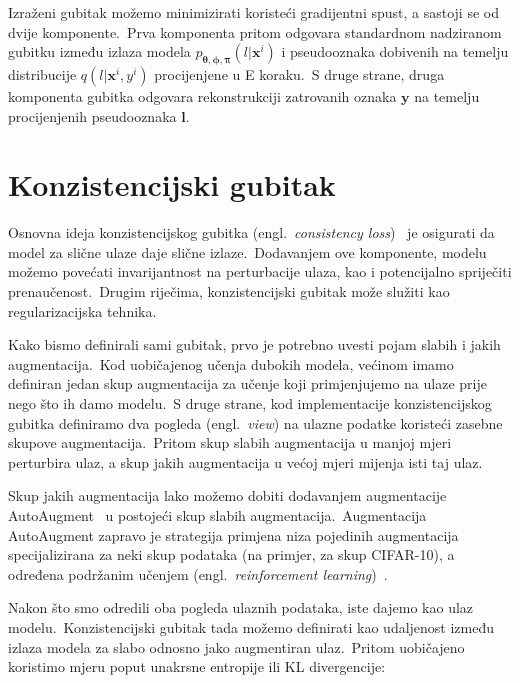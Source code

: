 \documentclass[diplomskirad]{fer}
\begin{document}
Izraženi gubitak možemo minimizirati koristeći gradijentni spust, a sastoji se od dvije komponente.\ 
Prva komponenta pritom odgovara standardnom nadziranom gubitku između izlaza modela $p_{\bm{\theta}, \bm{\phi}, \bm{\pi}}(l | \bm{x}^i)$ i pseudooznaka dobivenih na temelju distribucije $q(l | \bm{x}^i, y^i)$ procijenjene u E koraku.\ 
S druge strane, druga komponenta gubitka odgovara rekonstrukciji zatrovanih oznaka $\bm{y}$ na temelju procijenjenih pseudooznaka $\bm{l}$.\ 

\section{Konzistencijski gubitak}
\label{sek:con_loss}

Osnovna ideja konzistencijskog gubitka (engl.\ \textit{consistency loss})~\cite{berthelot2019mixmatch} je osigurati da model za slične ulaze daje slične izlaze.\ 
Dodavanjem ove komponente, modelu možemo povećati invarijantnost na perturbacije ulaza, kao i potencijalno spriječiti prenaučenost.\ 
Drugim riječima, konzistencijski gubitak može služiti kao regularizacijska tehnika.\ 

Kako bismo definirali sami gubitak, prvo je potrebno uvesti pojam slabih i jakih augmentacija.\ 
Kod uobičajenog učenja dubokih modela, većinom imamo definiran jedan skup augmentacija za učenje koji primjenjujemo na ulaze prije nego što ih damo modelu.\ 
S druge strane, kod implementacije konzistencijskog gubitka definiramo dva pogleda (engl.\ \textit{view}) na ulazne podatke koristeći zasebne skupove augmentacija.\ 
Pritom skup slabih augmentacija u manjoj mjeri perturbira ulaz, a skup jakih augmentacija u većoj mjeri mijenja isti taj ulaz.\ 

Skup jakih augmentacija lako možemo dobiti dodavanjem augmentacije AutoAugment~\cite{cubuk2019autoaugment} u postojeći skup slabih augmentacija.\
Augmentacija AutoAugment zapravo je strategija primjena niza pojedinih augmentacija specijalizirana za neki skup podataka (na primjer, za skup CIFAR-10), a određena podržanim učenjem (engl.\ \textit{reinforcement learning})~\cite{kaelbling1996reinforcement}.\ 

\pagebreak

Nakon što smo odredili oba pogleda ulaznih podataka, iste dajemo kao ulaz modelu.\ Konzistencijski gubitak tada možemo definirati kao udaljenost između izlaza modela za slabo odnosno jako augmentiran ulaz.\ Pritom uobičajeno koristimo mjeru poput unakrsne entropije ili KL divergencije:
\end{document}
